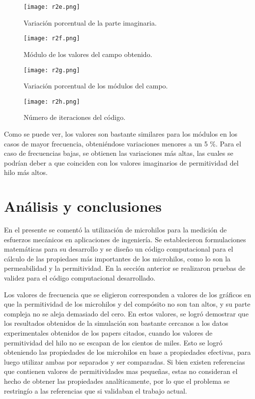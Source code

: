 \documentclass[12pt,letterpaper]{article}
\numberwithin{equation}{section}
\begin{document}
\begin{figure}[H]
	\centering\texttt{[image: r2e.png]}\\
	\caption{Variación porcentual de la parte imaginaria.}
	\label{fig:r2e}
\end{figure} 

\begin{figure}[H]
	\centering\texttt{[image: r2f.png]}\\
	\caption{Módulo de los valores del campo obtenido.}
	\label{fig:r2f}
\end{figure} 

\begin{figure}[H]
	\centering\texttt{[image: r2g.png]}\\
	\caption{Variación porcentual de los módulos del campo.}
	\label{fig:r2g}
\end{figure} 

\begin{figure}[H]
	\centering\texttt{[image: r2h.png]}\\
	\caption{Número de iteraciones del código.}
	\label{fig:r2h}
\end{figure} 


Como se puede ver, los valores son bastante similares para los módulos en los casos de mayor frecuencia, obteniéndose variaciones menores a un 5 \%. Para el caso de frecuencias bajas, se obtienen las variaciones más altas, las cuales se podrían deber a que coinciden con los valores imaginarios de permitividad del hilo más altos.


\section{Análisis y conclusiones} \label{sec:Analisis y conclusiones}

En el presente se comentó la utilización de microhilos para la medición de esfuerzos mecánicos en aplicaciones de ingeniería. Se establecieron formulaciones matemáticas para su desarrollo  y se diseño un código computacional para el cálculo de las propiedaes más importantes de los microhilos, como lo son la permeabilidad y la permitividad. En la sección anterior se realizaron pruebas de validez para el código computacional desarrollado. 

Los valores de frecuencia que se eligieron corresponden a valores de los gráficos en que la permitividad de los microhilos y del compósito no son tan altos, y su parte compleja no se aleja demasiado del cero. En estos valores, se logró demostrar que los resultados obtenidos de la simulación son bastante cercanos a los datos experimentales obtenidos de los papers citados, cuando los valores de permitividad del hilo no se escapan de los cientos de miles. Esto se logró obteniendo las propiedades de los microhilos en base a propiedades efectivas, para luego utilizar ambas por separados y ser comparadas. Si bien existen referencias que contienen valores de permitividades mas pequeñas, estas no consideran el hecho de obtener las propiedades analíticamente, por lo que el problema se restringío a las referencias que si validaban el trabajo actual.
\end{document}
